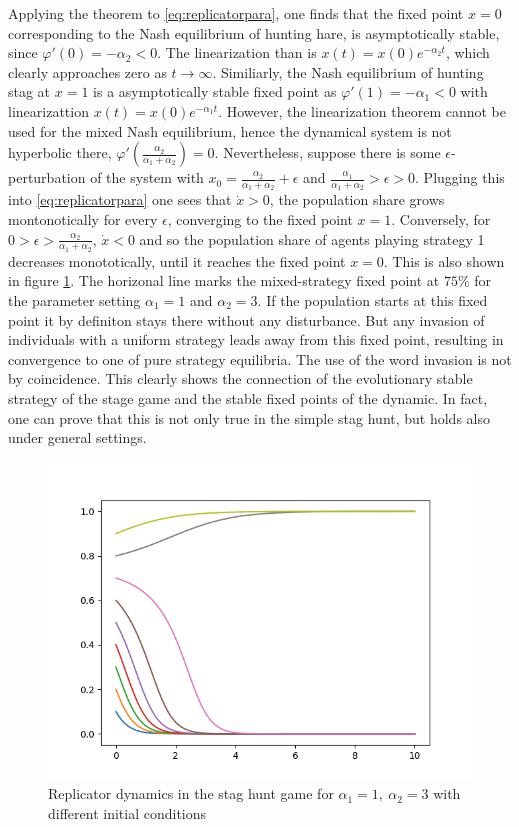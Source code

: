 \documentclass[11pt]{article}
\begin{document}
Applying the theorem to \eqref{eq:replicatorpara}, one finds that the 
fixed point $x=0$ corresponding to the Nash equilibrium of hunting hare, is 
asymptotically stable, since $\varphi'(0) = - \alpha_2 <0$. 
The linearization than is $x(t) = x(0) e^{-\alpha_2 t}$, which clearly 
approaches zero as $t \rightarrow \infty$. Similiarly, the Nash equilibrium 
of hunting stag at $x=1$ is a asymptotically stable fixed point as
$\varphi'(1) = -\alpha_1 <0$ with linearizattion $x(t) = x(0) e^{-\alpha_1 t}$.
However, the linearization theorem cannot be used for the mixed Nash 
equilibrium, hence the dynamical system is not hyperbolic there, 
$\varphi'(\frac{\alpha_2}{\alpha_1+\alpha_2}) = 0$. Nevertheless, suppose 
there is some $\epsilon$-perturbation of the system  
 with $x_0= \frac{\alpha_2}{\alpha_1+\alpha_2}+ \epsilon$ and 
 $\frac{\alpha_1}{\alpha_1+\alpha_2} > \epsilon > 0$. Plugging this into
 \eqref{eq:replicatorpara} one sees that $\dot{x} >0$, the population share
 grows montonotically for every $\epsilon$, converging to the fixed point 
 $x = 1$. Conversely, for $0 > \epsilon > \frac{\alpha_2}{\alpha_1+\alpha_2}$,
 $\dot{x} < 0$ and so the population share of agents 
 playing strategy 1 decreases monototically, until it reaches the 
 fixed point $x=0$. This is also shown in figure \ref{fig:basinofattraction}.
 The horizonal line marks the mixed-strategy fixed point at $75\%$ for the
 parameter setting $\alpha_1 = 1$ and $\alpha_2=3$. If the population starts
 at this fixed point it by definiton stays there without any disturbance. 
 But any invasion of individuals with a uniform strategy leads away from
 this fixed point, resulting in convergence to one of pure strategy equilibria.
 The use of the word invasion is not by coincidence. This clearly shows the 
 connection of the evolutionary stable strategy of the stage game and the 
 stable fixed points of the dynamic. In fact, one can prove that this is not
 only true in the simple stag hunt, but holds also under general settings.
\begin{figure}
        \centering
        \includegraphics[scale=0.5]{basinofattraction.png}
        \caption{Replicator dynamics in the stag hunt game for 
                $\alpha_1=1,\ \alpha_2=3$ with different initial conditions}
                \label{fig:basinofattraction}
\end{figure}
\end{document}
